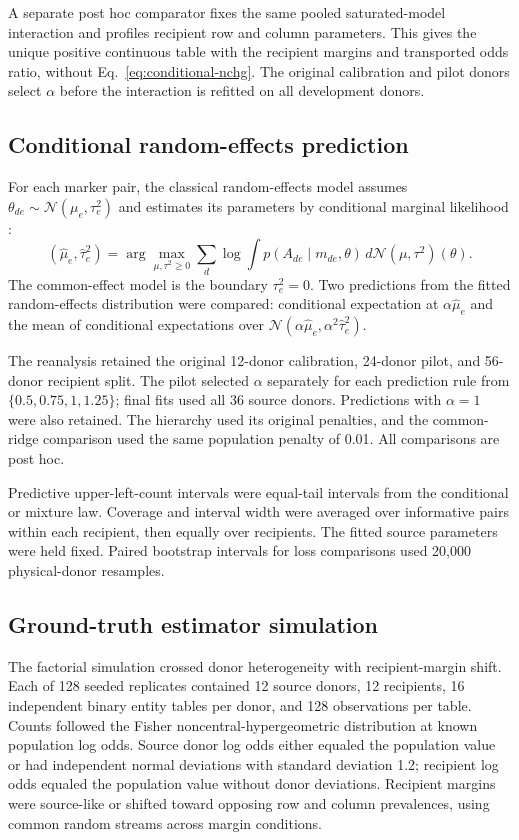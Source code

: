 \documentclass[10pt,a4paper]{article}
\begin{document}
A separate post hoc comparator fixes the same pooled saturated-model interaction and profiles recipient row and column parameters. This gives the unique positive continuous table with the recipient margins and transported odds ratio, without Eq.~\eqref{eq:conditional-nchg}. The original calibration and pilot donors select $\alpha$ before the interaction is refitted on all development donors.

\subsection{Conditional random-effects prediction}

For each marker pair, the classical random-effects model assumes
$\theta_{de}\sim\mathcal N(\mu_e,\tau_e^2)$ and estimates its parameters
by conditional marginal likelihood \cite{jackson2018}:
\[
 (\widehat\mu_e,\widehat\tau_e^2)
 =\arg\max_{\mu,\tau^2\geq0}
 \sum_d\log\int p(A_{de}\mid m_{de},\theta)
 \,d\mathcal N(\mu,\tau^2)(\theta).
\]
The common-effect model is the boundary $\tau_e^2=0$. Two predictions from
the fitted random-effects distribution were compared: conditional expectation
at $\alpha\widehat\mu_e$ and the mean of conditional expectations over
$\mathcal N(\alpha\widehat\mu_e,\alpha^2\widehat\tau_e^2)$.

The reanalysis retained the original 12-donor calibration, 24-donor pilot,
and 56-donor recipient split. The pilot selected $\alpha$ separately for
each prediction rule from $\{0.5,0.75,1,1.25\}$; final fits used all
36 source donors. Predictions with $\alpha=1$ were also retained. The
hierarchy used its original penalties, and the common-ridge comparison
used the same population penalty of 0.01. All comparisons are post hoc.

Predictive upper-left-count intervals were equal-tail intervals from the
conditional or mixture law. Coverage and interval width were averaged over
informative pairs within each recipient, then equally over recipients.
The fitted source parameters were held fixed. Paired bootstrap intervals for
loss comparisons used 20,000 physical-donor resamples.

\subsection{Ground-truth estimator simulation}

The factorial simulation crossed donor heterogeneity with recipient-margin shift. Each of 128 seeded replicates contained 12 source donors, 12 recipients, 16 independent binary entity tables per donor, and 128 observations per table. Counts followed the Fisher noncentral-hypergeometric distribution at known population log odds. Source donor log odds either equaled the population value or had independent normal deviations with standard deviation 1.2; recipient log odds equaled the population value without donor deviations. Recipient margins were source-like or shifted toward opposing row and column prevalences, using common random streams across margin conditions.
\end{document}
